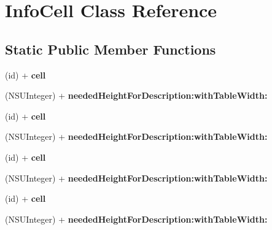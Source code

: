 \hypertarget{interface_info_cell}{
\section{\-Info\-Cell \-Class \-Reference}
\label{interface_info_cell}
}
\subsection*{\-Static \-Public \-Member \-Functions}
\begin{DoxyCompactItemize}
\item 
\hypertarget{interface_info_cell_ab3eb46f14880fce19509c2fde7a57b75}{
(id) + {\bfseries cell}}
\label{interface_info_cell_ab3eb46f14880fce19509c2fde7a57b75}

\item 
\hypertarget{interface_info_cell_a735d4133e8a3717281eb47e60562597a}{
(\-N\-S\-U\-Integer) + {\bfseries needed\-Height\-For\-Description\-:with\-Table\-Width\-:}}
\label{interface_info_cell_a735d4133e8a3717281eb47e60562597a}

\item 
\hypertarget{interface_info_cell_ab3eb46f14880fce19509c2fde7a57b75}{
(id) + {\bfseries cell}}
\label{interface_info_cell_ab3eb46f14880fce19509c2fde7a57b75}

\item 
\hypertarget{interface_info_cell_a735d4133e8a3717281eb47e60562597a}{
(\-N\-S\-U\-Integer) + {\bfseries needed\-Height\-For\-Description\-:with\-Table\-Width\-:}}
\label{interface_info_cell_a735d4133e8a3717281eb47e60562597a}

\item 
\hypertarget{interface_info_cell_ab3eb46f14880fce19509c2fde7a57b75}{
(id) + {\bfseries cell}}
\label{interface_info_cell_ab3eb46f14880fce19509c2fde7a57b75}

\item 
\hypertarget{interface_info_cell_a735d4133e8a3717281eb47e60562597a}{
(\-N\-S\-U\-Integer) + {\bfseries needed\-Height\-For\-Description\-:with\-Table\-Width\-:}}
\label{interface_info_cell_a735d4133e8a3717281eb47e60562597a}

\item 
\hypertarget{interface_info_cell_ab3eb46f14880fce19509c2fde7a57b75}{
(id) + {\bfseries cell}}
\label{interface_info_cell_ab3eb46f14880fce19509c2fde7a57b75}

\item 
\hypertarget{interface_info_cell_a735d4133e8a3717281eb47e60562597a}{
(\-N\-S\-U\-Integer) + {\bfseries needed\-Height\-For\-Description\-:with\-Table\-Width\-:}}
\label{interface_info_cell_a735d4133e8a3717281eb47e60562597a}

\end{DoxyCompactItemize}


